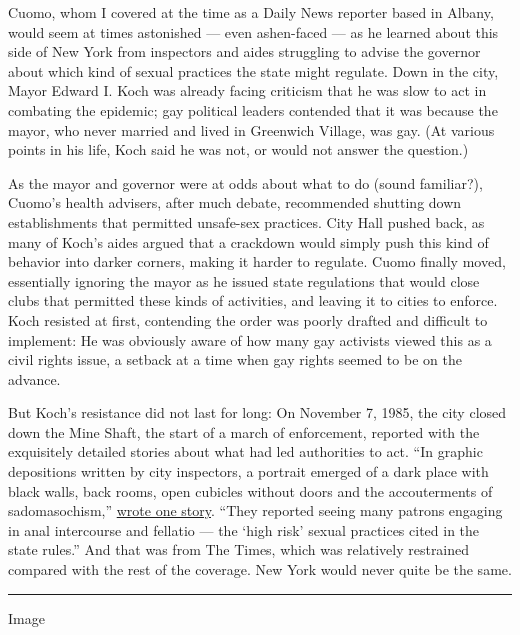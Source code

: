 Cuomo, whom I covered at the time as a Daily News reporter based in
Albany, would seem at times astonished --- even ashen-faced --- as he
learned about this side of New York from inspectors and aides struggling
to advise the governor about which kind of sexual practices the state
might regulate. Down in the city, Mayor Edward I. Koch was already
facing criticism that he was slow to act in combating the epidemic; gay
political leaders contended that it was because the mayor, who never
married and lived in Greenwich Village, was gay. (At various points in
his life, Koch said he was not, or would not answer the question.)

As the mayor and governor were at odds about what to do (sound
familiar?), Cuomo's health advisers, after much debate, recommended
shutting down establishments that permitted unsafe-sex practices. City
Hall pushed back, as many of Koch's aides argued that a crackdown would
simply push this kind of behavior into darker corners, making it harder
to regulate. Cuomo finally moved, essentially ignoring the mayor as he
issued state regulations that would close clubs that permitted these
kinds of activities, and leaving it to cities to enforce. Koch resisted
at first, contending the order was poorly drafted and difficult to
implement: He was obviously aware of how many gay activists viewed this
as a civil rights issue, a setback at a time when gay rights seemed to
be on the advance.

But Koch's resistance did not last for long: On November 7, 1985, the
city closed down the Mine Shaft, the start of a march of enforcement,
reported with the exquisitely detailed stories about what had led
authorities to act. ``In graphic depositions written by city inspectors,
a portrait emerged of a dark place with black walls, back rooms, open
cubicles without doors and the accouterments of sadomasochism,''
\href{https://www.nytimes.com/1985/11/08/nyregion/city-closes-bar-frequented-by-homosexuals-citing-sexual-activity-linked-to-aids.html}{wrote
one story}. ``They reported seeing many patrons engaging in anal
intercourse and fellatio --- the `high risk' sexual practices cited in
the state rules.'' And that was from The Times, which was relatively
restrained compared with the rest of the coverage. New York would never
quite be the same.

\begin{center}\rule{0.5\linewidth}{\linethickness}\end{center}

Image

